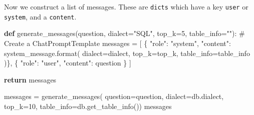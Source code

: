 \documentclass[
  letterpaper,
  DIV=11,
  numbers=noendperiod]{scrartcl}
\newenvironment{Shaded}{\begin{snugshade}}{\end{snugshade}}
\newcommand{\BuiltInTok}[1]{\textcolor[rgb]{0.00,0.23,0.31}{#1}}
\newcommand{\CommentTok}[1]{\textcolor[rgb]{0.37,0.37,0.37}{#1}}
\newcommand{\ControlFlowTok}[1]{\textcolor[rgb]{0.00,0.23,0.31}{\textbf{#1}}}
\newcommand{\DecValTok}[1]{\textcolor[rgb]{0.68,0.00,0.00}{#1}}
\newcommand{\KeywordTok}[1]{\textcolor[rgb]{0.00,0.23,0.31}{\textbf{#1}}}
\newcommand{\NormalTok}[1]{\textcolor[rgb]{0.00,0.23,0.31}{#1}}
\newcommand{\OperatorTok}[1]{\textcolor[rgb]{0.37,0.37,0.37}{#1}}
\newcommand{\StringTok}[1]{\textcolor[rgb]{0.13,0.47,0.30}{#1}}
\begin{document}
Now we construct a list of messages. These are \texttt{dicts} which have
a key \texttt{user} or \texttt{system}, and a \texttt{content}.

\begin{Shaded}
\begin{Highlighting}[numbers=left,,]
\KeywordTok{def}\NormalTok{ generate\_messages(question, dialect}\OperatorTok{=}\StringTok{"SQL"}\NormalTok{, top\_k}\OperatorTok{=}\DecValTok{5}\NormalTok{, table\_info}\OperatorTok{=}\StringTok{""}\NormalTok{):}
    \CommentTok{\# Create a ChatPromptTemplate}
\NormalTok{    messages }\OperatorTok{=}\NormalTok{ [}
\NormalTok{      \{}
        \StringTok{"role"}\NormalTok{: }\StringTok{"system"}\NormalTok{, }
        \StringTok{"content"}\NormalTok{: system\_message.}\BuiltInTok{format}\NormalTok{(}
\NormalTok{          dialect}\OperatorTok{=}\NormalTok{dialect, }
\NormalTok{          top\_k}\OperatorTok{=}\NormalTok{top\_k, }
\NormalTok{          table\_info}\OperatorTok{=}\NormalTok{table\_info}
\NormalTok{        )\},}
\NormalTok{      \{}
        \StringTok{"role"}\NormalTok{: }\StringTok{"user"}\NormalTok{, }
        \StringTok{"content"}\NormalTok{: question}
\NormalTok{      \}}
\NormalTok{    ]}
    
    \ControlFlowTok{return}\NormalTok{ messages}

\NormalTok{messages }\OperatorTok{=}\NormalTok{ generate\_messages(}
\NormalTok{  question}\OperatorTok{=}\NormalTok{question, }
\NormalTok{  dialect}\OperatorTok{=}\NormalTok{db.dialect, top\_k}\OperatorTok{=}\DecValTok{10}\NormalTok{, }
\NormalTok{  table\_info}\OperatorTok{=}\NormalTok{db.get\_table\_info())}
\NormalTok{messages}
\end{Highlighting}
\end{Shaded}
\end{document}
